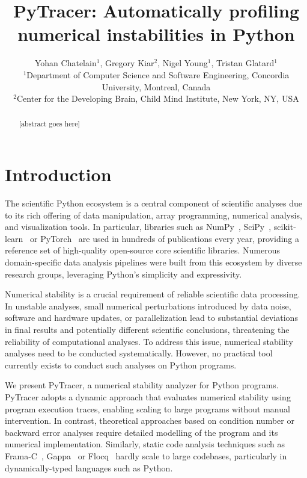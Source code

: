 \documentclass[11pt]{article}
\begin{document}
\makeatletter
\let\orig@lstnumber=\thelstnumber
\newcommand\lstsetnumber[1]{\gdef\thelstnumber{#1}}
\newcommand\lstresetnumber{\global\let\thelstnumber=\orig@lstnumber}
\makeatother

\title{PyTracer: Automatically profiling numerical instabilities in Python}
\author{Yohan Chatelain$^1$, Gregory Kiar$^2$, Nigel Young$^1$, Tristan Glatard$^1$\\
$^1$Department of Computer Science and Software Engineering, Concordia University, Montreal, Canada\\
$^2$Center for the Developing Brain, Child Mind Institute, New York, NY, USA}
\date{}
\maketitle

\begin{abstract}
[abstract goes here]
\end{abstract}

\section{Introduction}

The scientific Python ecosystem is a central component of scientific
analyses due to its rich offering of data manipulation, array programming,
numerical analysis, and visualization tools. In particular, libraries such
as NumPy~\cite{harris2020array}, SciPy~\cite{virtanen2020scipy}, scikit-learn~\cite{pedregosa2011scikit} or PyTorch~\cite{paszke2019pytorch} are used in hundreds of publications every year, providing a reference set of high-quality open-source core scientific libraries. Numerous domain-specific data analysis pipelines were built from this ecosystem by diverse research groups, leveraging Python's simplicity and expressivity. 

Numerical stability is a crucial requirement of reliable scientific data
processing. In unstable analyses, small numerical perturbations introduced
by data noise, software and hardware updates, or parallelization lead to
substantial deviations in final results and potentially different scientific conclusions, threatening the reliability of computational analyses. To address this issue, numerical stability analyses need to be conducted systematically. However, no practical tool currently exists to conduct such analyses on Python programs.

We present PyTracer, a numerical stability analyzer for Python programs.
PyTracer adopts a dynamic approach that evaluates numerical stability using program execution traces, enabling scaling to large programs without manual intervention. In contrast, theoretical approaches based on condition number or backward error analyses require detailed modelling of the program and its numerical implementation. Similarly, static code analysis techniques such as Frama-C~\cite{cuoq2012frama}, Gappa~\cite{de2010certifying} or Flocq~\cite{boldo2011flocq} hardly scale to large codebases, particularly in dynamically-typed languages such as Python.
\end{document}
